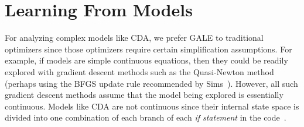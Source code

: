 \documentclass[journal]{IEEEtran}
\begin{document}
 





\section{Learning From Models}\label{sec:lfm}


For analyzing complex models like CDA, we prefer GALE to traditional  optimizers since those optimizers require certain simplification assumptions.
For example, if models are simple continuous equations, then they could be readily explored with gradient descent methods such as the Quasi-Newton method (perhaps using the BFGS update rule recommended by Sims~\cite{Sims10}).
However, all such gradient descent methods assume that the model being explored is essentially continuous. 
Models like CDA are not continuous since their internal state space is divided into one combination of each branch of each {\em if statement} in the code~\cite{Davies2012}.
\end{document}
